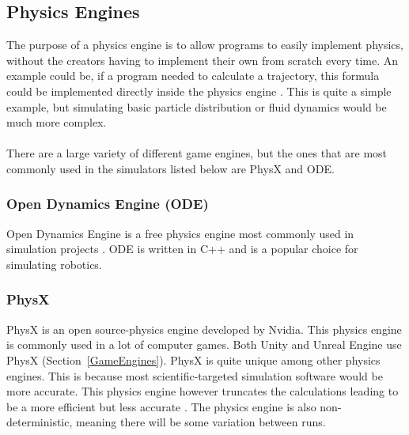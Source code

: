 \subsection{Physics Engines}
The purpose of a physics engine is to allow programs to easily implement physics, without the creators having to implement their own from scratch every time. An example could be, if a program needed to calculate a trajectory, this formula could be implemented directly inside the physics engine \cite{millington2007game}. This is quite a simple example, but simulating basic particle distribution or fluid dynamics would be much more complex. 
\\~\\
There are a large variety of different game engines, but the ones that are most commonly used in the simulators listed below are PhysX and ODE.

\subsubsection{Open Dynamics Engine (ODE)}
Open Dynamics Engine is a free physics engine most commonly used in simulation projects \cite{ODEPaper}. ODE is written in C++ and is a popular choice for simulating robotics. 

\subsubsection{PhysX}
PhysX is an open source-physics engine developed by Nvidia. This physics engine is commonly used in a lot of computer games. Both Unity and Unreal Engine use PhysX (Section~\ref{GameEngines}). PhysX is quite unique among other physics engines. This is because most scientific-targeted simulation software would be more accurate. This physics engine however truncates the calculations leading to be a more efficient but less accurate \cite{Martinez-FrancoJuanC2018PAAM}. The physics engine is also non-deterministic, meaning there will be some variation between runs. 





